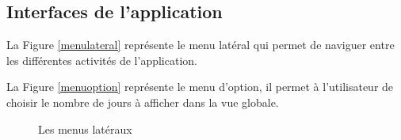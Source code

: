 \begin{appendix}
\section*{Interfaces de l'application}

La Figure \ref{menulateral} repr\'esente le menu lat\'eral qui permet de naviguer entre les diff\'erentes activit\'es de l'application.

La Figure \ref{menuoption} repr\'esente le menu d'option, il permet \`a l'utilisateur de choisir le nombre de jours \`a afficher dans la vue globale.
\begin{figure}[H]
\centering
	
		
	\caption{Les menus lat\'eraux}
	\label{home}
	
\end{figure}
\end{appendix}